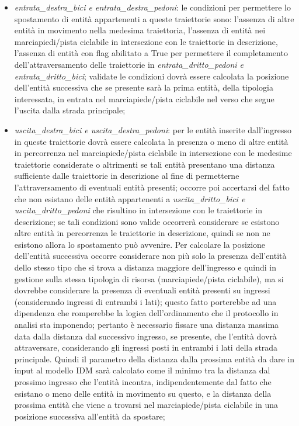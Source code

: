 \begin{enumerate}
\begin{enumerate}
\begin{itemize}
\item \textit{en\-tra\-ta\_des\-tra\_bi\-ci e en\-tra\-ta\_des\-tra\_pe\-do\-ni}: le condizioni per permettere lo spostamento di entità appartenenti a queste traiettorie sono: l'assenza di altre entità in movimento nella medesima traiettoria, l'assenza di entità nei marciapiedi/pista ciclabile in intersezione con le traiettorie in descrizione, l'assenza di entità con flag abilitato a True per permettere il completamento dell'attraversamento delle traiettorie in \textit{en\-tra\-ta\_drit\-to\_pe\-do\-ni e en\-tra\-ta\_drit\-to\_bi\-ci}; validate le condizioni dovrà essere calcolata la posizione dell'entità successiva che se presente sarà la prima entità, della tipologia interessata, in entrata nel marciapiede/pista ciclabile nel verso che segue l'uscita dalla strada principale;
\item \textit{usci\-ta\_des\-tra\_bi\-ci e usci\-ta\_des\-tra\_pe\-do\-ni}: per
le entità inserite dall'ingresso in queste traiettorie dovrà essere calcolata la presenza o meno di altre entità in percorrenza nel marciapiede/pista ciclabile in intersezione con le medesime traiettorie considerate o altrimenti se tali entità presentano una distanza sufficiente dalle traiettorie in descrizione al fine di permetterne l'attraversamento di eventuali entità presenti; occorre poi accertarsi del fatto che non esistano delle entità appartenenti a \textit{usci\-ta\_drit\-to\_bi\-ci e usci\-ta\_drit\-to\_pe\-do\-ni} che risultino in intersezione con le traiettorie in descrizione; se tali condizioni sono valide occorrerà considerare se esistono altre entità in percorrenza le traiettorie in descrizione, quindi se non ne esistono allora lo spostamento può avvenire. Per calcolare la posizione dell'entità successiva occorre considerare non più solo la presenza dell'entità dello stesso tipo che si trova a distanza maggiore dell'ingresso e quindi in gestione sulla stessa tipologia di risorsa (marciapiede/pista ciclabile), ma si dovrebbe considerare la presenza di eventuali entità presenti su ingressi (considerando ingressi di entrambi i lati); questo fatto porterebbe ad una dipendenza che romperebbe la logica dell'ordinamento che il protocollo in analisi sta imponendo; pertanto è necessario fissare una distanza massima data dalla distanza dal successivo ingresso, se presente, che l'entità dovrà attraversare, considerando gli ingressi posti in entrambi i lati della strada principale. Quindi il parametro della distanza dalla prossima entità da dare in input al modello \ac{IDM} sarà calcolato come il minimo tra la distanza dal prossimo ingresso che l'entità incontra, indipendentemente dal fatto che esistano o meno delle entità in movimento su questo, e la distanza della prossima entità che viene a trovarsi nel marciapiede/pista ciclabile in una posizione successiva all'entità da spostare;

\end{itemize}
\end{enumerate}
\end{enumerate}

